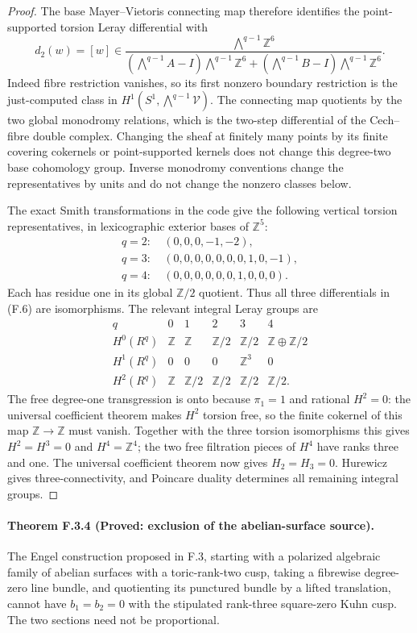 \begin{proof}
The base Mayer--Vietoris connecting map therefore identifies
the point-supported torsion Leray differential with
\[
d_2(w)=[w]\in
\frac{\bigwedge^{q-1}\mathbb Z^6}
 {(\bigwedge^{q-1}A-I)\bigwedge^{q-1}\mathbb Z^6+
  (\bigwedge^{q-1}B-I)\bigwedge^{q-1}\mathbb Z^6}.
\tag{F.6}
\]
Indeed fibre restriction vanishes, so its first nonzero
boundary restriction is the just-computed class in
$H^1(S^1,\bigwedge^{q-1}\mathcal V)$.
The connecting map quotients by the two global monodromy
relations, which is the two-step differential of the
Cech--fibre double complex.
Changing the sheaf at finitely many points by its finite
covering cokernels or point-supported kernels does not
change this degree-two base cohomology group.
Inverse monodromy conventions change the representatives
by units and do not change the nonzero classes below.

The exact Smith transformations in the code give the
following vertical torsion representatives, in lexicographic
exterior bases of $\mathbb Z^5$:
\[
\begin{split}
q=2:\ &(0,0,0,-1,-2),\\
q=3:\ &(0,0,0,0,0,0,0,1,0,-1),\\
q=4:\ &(0,0,0,0,0,0,1,0,0,0).
\end{split}
\]
Each has residue one in its global $\mathbb Z/2$ quotient.
Thus all three differentials in (F.6) are isomorphisms.
The relevant integral Leray groups are
\[
\begin{array}{c|ccccc}
q&0&1&2&3&4\\ \hline
H^0(R^q)&\mathbb Z&\mathbb Z&\mathbb Z/2&
 \mathbb Z/2&\mathbb Z\oplus\mathbb Z/2\\
H^1(R^q)&0&0&0&\mathbb Z^3&0\\
H^2(R^q)&\mathbb Z&\mathbb Z/2&\mathbb Z/2&
 \mathbb Z/2&\mathbb Z/2 .
\end{array}
\]
The free degree-one transgression is onto because $\pi_1=1$
and rational $H^2=0$: the universal coefficient theorem makes
$H^2$ torsion free, so the finite cokernel of this map
$\mathbb Z\to\mathbb Z$ must vanish.  Together with the three torsion
isomorphisms this gives $H^2=H^3=0$ and $H^4=\mathbb Z^4$;
the two free filtration pieces of $H^4$ have ranks three
and one.  The universal coefficient theorem now gives
$H_2=H_3=0$.  Hurewicz gives three-connectivity, and Poincare
duality determines all remaining integral groups.
\end{proof}

\paragraph{Theorem F.3.4 (Proved: exclusion of the abelian-surface source).}
The Engel construction proposed in F.3, starting with a polarized
algebraic family of abelian surfaces with a toric-rank-two cusp,
taking a fibrewise degree-zero line bundle, and quotienting its
punctured bundle by a lifted translation, cannot have $b_1=b_2=0$
with the stipulated rank-three square-zero Kuhn cusp.
The two sections need not be proportional.

